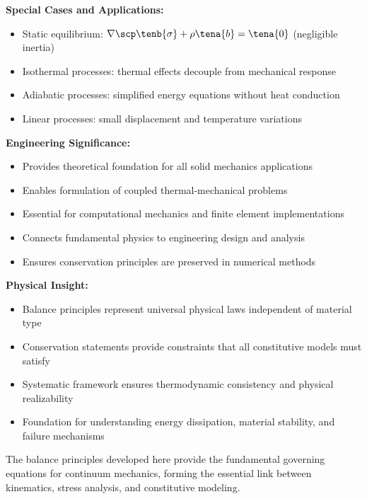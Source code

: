 \begin{subox}[Summary]
\textbf{Special Cases and Applications:}
\begin{itemize}
\item Static equilibrium: $\nabla \scp \tenb{\sigma} + \rho \tena{b} = \tena{0}$ (negligible inertia)
\item Isothermal processes: thermal effects decouple from mechanical response
\item Adiabatic processes: simplified energy equations without heat conduction
\item Linear processes: small displacement and temperature variations
\end{itemize}

\textbf{Engineering Significance:}
\begin{itemize}
\item Provides theoretical foundation for all solid mechanics applications
\item Enables formulation of coupled thermal-mechanical problems
\item Essential for computational mechanics and finite element implementations
\item Connects fundamental physics to engineering design and analysis
\item Ensures conservation principles are preserved in numerical methods
\end{itemize}

\textbf{Physical Insight:}
\begin{itemize}
\item Balance principles represent universal physical laws independent of material type
\item Conservation statements provide constraints that all constitutive models must satisfy
\item Systematic framework ensures thermodynamic consistency and physical realizability
\item Foundation for understanding energy dissipation, material stability, and failure mechanisms
\end{itemize}

The balance principles developed here provide the fundamental governing equations for continuum mechanics, forming the essential link between kinematics, stress analysis, and constitutive modeling.
\end{subox}